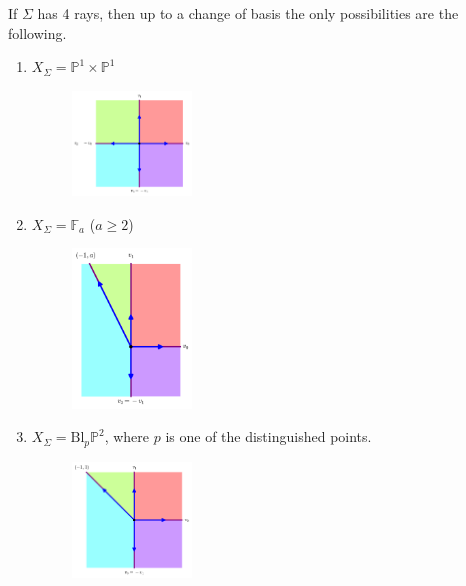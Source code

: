 \documentclass[a4paper,12pt]{amsart}
\newcommand{\PP}{\mathbb{P}}
\begin{document}
\begin{exercise}
	If $\Sigma$ has 4 rays, then up to a change of basis the only possibilities are the following.
	\begin{enumerate}[(1)]
		\item $X_\Sigma=\PP^1\times\PP^1$
		\begin{figure}[h]
			\centering
			\includegraphics[width=0.3\textwidth]{pic/Mar21_fan5}
		\end{figure}
		
		\item $X_\Sigma=\mathbb{F}_a$ ($a\geq 2$)
		\begin{figure}[h]
			\centering
			\includegraphics[width=0.3\textwidth]{pic/Mar21_fan6}
		\end{figure}
		\item $X_\Sigma=\text{Bl}_p\PP^2$, where $p$ is one of the distinguished points.
		\begin{figure}[h]
			\centering
			\includegraphics[width=0.3\textwidth]{pic/Mar21_fan7}
		\end{figure}
	\end{enumerate}
\end{exercise}
\vspace{5cm}
\end{document}
